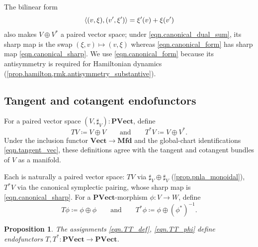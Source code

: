 \documentclass[11pt, oneside, article]{memoir}
\theoremstyle{definition}
\theoremstyle{plain}
\newtheorem{proposition}[proposition]{Proposition}
\newenvironment{remark}
  {\pushQED{\qed}\renewcommand{\qedsymbol}{$\lozenge$}\remarkx}
  {\popQED\endremarkx}
\DeclarePairedDelimiter{\pairing}{\langle}{\rangle}
\newcommand{\Cat}[1]{\mathbf{#1}}%
\newcommand{\inv}{^{-1}}
\newcommand{\vect}{\Cat{Vect}}
\newcommand{\qqand}{\qquad\text{and}\qquad}
\newcommand{\mfd}{\Cat{Mfd}}
\newcommand{\pvect}{\Cat{PVect}}
\begin{document}
\begin{remark}[Sign convention]\label{rmk.swap_pairing}
The bilinear form
\[
\pairing{(v,\xi),(v',\xi')}=\xi'(v)+\xi(v')
\]
also makes $V\oplus V^*$ a paired vector space; under \eqref{eqn.canonical_dual_sum}, its sharp map is the swap $(\xi,v)\mapsto(v,\xi)$ whereas \eqref{eqn.canonical_form} has sharp map \eqref{eqn.canonical_sharp}. We use \eqref{eqn.canonical_form} because its antisymmetry is required for Hamiltonian dynamics (\cref{prop.hamilton,rmk.antisymmetry_substantive}).\qedhere
\end{remark}

\subsection{Tangent and cotangent endofunctors}\label{sec.TT}

For a paired vector space $(V,\sharp_V):\pvect$, define
\begin{equation}\label{eqn.TT_def}
TV\coloneqq V\oplus V \qqand T^*V\coloneqq V\oplus V^*.
\end{equation}
Under the inclusion functor $\vect\to\mfd$ and the global-chart identifications \eqref{eqn.tangent_vec}, these definitions agree with the tangent and cotangent bundles of $V$ as a manifold.

Each is naturally a paired vector space: $TV$ via $\sharp_V\oplus\sharp_V$ (\cref{prop.pnla_monoidal}), $T^*V$ via the canonical symplectic pairing, whose sharp map is \eqref{eqn.canonical_sharp}.
For a $\pvect$-morphism $\phi\colon V\to W$, define
\begin{equation}\label{eqn.TT_phi}
T\phi\coloneqq\phi\oplus\phi
\qqand
 T^*\phi\coloneqq\phi\oplus(\phi^*)\inv.
\end{equation}

\begin{proposition}\label{prop.TT_endofunctors}
The assignments \eqref{eqn.TT_def}, \eqref{eqn.TT_phi} define endofunctors $T,T^*\colon\pvect\to\pvect$.
\end{proposition}
\end{document}
